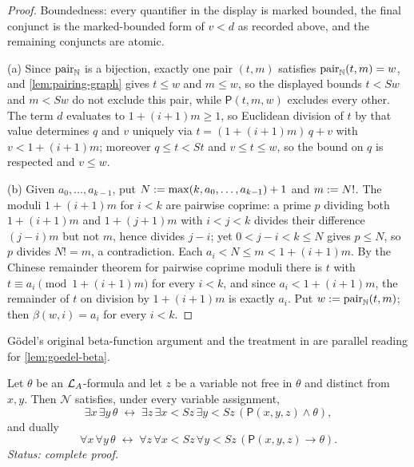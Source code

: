 \begin{proof}
Boundedness: every quantifier in the display is marked bounded, the final
conjunct is the marked-bounded form of \(v<d\) as recorded above, and the
remaining conjuncts are atomic.

(a) Since \(\operatorname{pair}_{\mathbb{N}}\) is a bijection, exactly one pair
\((t,m)\) satisfies \(\operatorname{pair}_{\mathbb{N}}(t,m)=w\), and
\cref{lem:pairing-graph} gives \(t\leq w\) and \(m\leq w\), so the
displayed bounds \(t<Sw\) and \(m<Sw\) do not exclude this pair, while
\(\mathsf P(t,m,w)\) excludes every other.  The term \(d\) evaluates to
\(1+(i+1)m\geq1\), so Euclidean division of \(t\) by that value determines
\(q\) and \(v\) uniquely via \(t=(1+(i+1)m)\,q+v\) with \(v<1+(i+1)m\);
moreover \(q\leq t<St\) and \(v\leq t\leq w\), so the bound on \(q\) is
respected and \(v\leq w\).

(b) Given \(a_0,\ldots,a_{k-1}\), put
\(N\mathrel{:=}\max(k,a_0,\ldots,a_{k-1})+1\) and \(m\mathrel{:=} N!\).  The moduli
\(1+(i+1)m\) for \(i<k\) are pairwise coprime: a prime \(p\) dividing both
\(1+(i+1)m\) and \(1+(j+1)m\) with \(i<j<k\) divides their difference
\((j-i)m\) but not \(m\), hence divides \(j-i\); yet \(0<j-i<k\leq N\)
gives \(p\leq N\), so \(p\) divides \(N!=m\), a contradiction.  Each
\(a_i<N\leq m<1+(i+1)m\).  By the Chinese remainder theorem for pairwise
coprime moduli there is \(t\) with \(t\equiv a_i\pmod{1+(i+1)m}\) for
every \(i<k\), and since \(a_i<1+(i+1)m\), the remainder of \(t\) on
division by \(1+(i+1)m\) is exactly \(a_i\).  Put
\(w\mathrel{:=}\operatorname{pair}_{\mathbb{N}}(t,m)\); then \(\beta(w,i)=a_i\) for
every \(i<k\).
\end{proof}

G\"odel's original beta-function argument \cite{Godel1931} and the
treatment in \cite[ch.~16]{BoolosBurgessJeffrey2007} are parallel reading
for \cref{lem:goedel-beta}.

\begin{lemma}
\label{lem:pair-contraction}
Let \(\theta\) be an \(\mathcal{L}_A\)-formula and let \(z\) be a variable not
free in \(\theta\) and distinct from \(x,y\).  Then \(\mathcal N\)
satisfies, under every variable assignment,
\[
  \exists x\,\exists y\,\theta
  \;\leftrightarrow\;
  \exists z\,\exists x<Sz\,\exists y<Sz\,(\mathsf P(x,y,z)\land\theta),
\]
and dually
\[
  \forall x\,\forall y\,\theta
  \;\leftrightarrow\;
  \forall z\,\forall x<Sz\,\forall y<Sz\,(\mathsf P(x,y,z)\to\theta).
\]
\textit{Status: complete proof.}
\end{lemma}

